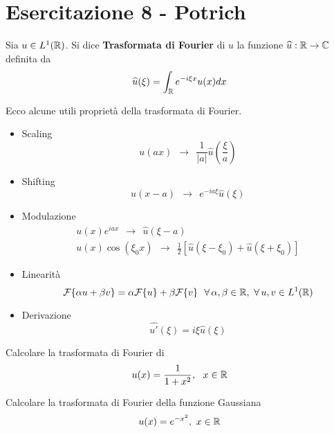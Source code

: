 \chapter{Esercitazione 8 - Potrich}
\ParteEsercizi
\begin{defn}
Sia $u\in L^{1}(\mathbb{R})$. Si dice \textbf{Trasformata di Fourier} di $u$ la funzione $\widehat{u} :\mathbb{R} \rightarrow \mathbb{C} $ definita da
\begin{equation*}
\widehat{u}(\xi) = \int_{\mathbb{R}} e^{- i\xi x} u(x) dx
\end{equation*}
\end{defn}
\begin{thm}
[Proprietà] Ecco alcune utili proprietà della trasformata di Fourier.
\begin{itemize}
\item Scaling
\begin{equation*}
u(ax) \ \ \rightarrow \ \ \frac{1}{| a|}\hat{u}\left(\frac{\xi}{a}\right)
\end{equation*}
\item Shifting
\begin{equation*}
u(x - a) \ \ \rightarrow \ \ e^{- ia\xi}\hat{u}(\xi)
\end{equation*}
\item Modulazione
\begin{gather*}
u(x) e^{iax} \ \ \rightarrow \ \ \hat{u}(\xi - a)\\
u(x)\cos(\xi_{0} x) \ \ \rightarrow \ \ \frac{1}{2}[\hat{u}(\xi - \xi_{0}) + \hat{u}(\xi + \xi_{0})]
\end{gather*}
\item Linearità
\begin{equation*}
\Fc \{\alpha u + \beta v\} = \alpha \Fc \{u\} + \beta \Fc \{v\} \ \ \forall \alpha, \beta \in \RR, \ \forall u, v\in L^{1}(\RR)
\end{equation*}
\item Derivazione
\begin{equation*}
\widehat{u'}(\xi) = i\xi \hat{u}(\xi)
\end{equation*}
\end{itemize}
\end{thm}

Calcolare la trasformata di Fourier di
\begin{equation*}
u(x) = \frac{1}{1 + x^{2}}, \ \ x\in \mathbb{R} 
\end{equation*}

Calcolare la trasformata di Fourier della funzione Gaussiana
\begin{equation*}
u(x) = e^{- x^{2}}, \ x\in \mathbb{R} 
\end{equation*}
\Esercizio{}

